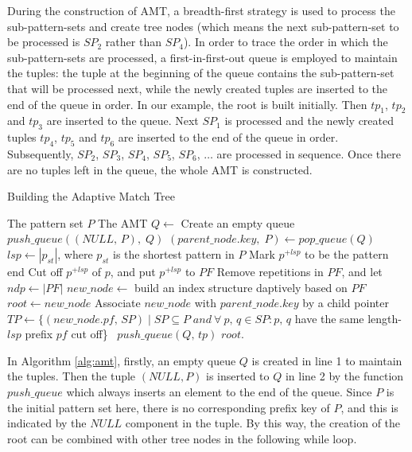 \documentclass[legalpaper]{article}
\begin{document}
During the construction of \textsf{AMT}, a \textsf{breadth-first}
strategy is used to process the sub-pattern-sets and create tree nodes
(which means the next sub-pattern-set to be processed is $SP_2$ rather
than $SP_4$). In order to trace the order in which the
sub-pattern-sets are processed, a \textsf{first-in-first-out} queue is
employed to maintain the tuples: the tuple at the beginning of the
queue contains the sub-pattern-set that will be processed next, while
the newly created tuples are inserted to the end of the queue in
order. In our example, the root is built initially. Then $tp_1$,
$tp_2$ and $tp_3$ are inserted to the queue. Next $SP_1$ is processed
and the newly created tuples $tp_4$, $tp_5$ and $tp_6$ are inserted to
the end of the queue in order. Subsequently, $SP_2$, $SP_3$, $SP_4$,
$SP_5$, $SP_6$, $\dots$ are processed in sequence. Once there are no
tuples left in the queue, the whole \textsf{AMT} is constructed.

\begin{algorithm}
  \caption{Building the Adaptive Match Tree}
  \label{alg:amt}
  \begin{algorithmic}[1]
    \REQUIRE The pattern set $P$
    \ENSURE The AMT
    \STATE $Q \leftarrow$ Create an empty queue
    \STATE $push\_queue((NULL,\,P),\; Q)$
    \STATE
    \STATE $(parent\_node.key,\; P) \leftarrow pop\_queue(Q)$
    \STATE $lsp \leftarrow |p_{st}|$, where $p_{st}$ is the shortest pattern in $P$
    \STATE Mark $p^{+lsp}$ to be the pattern end
    \ENDIF
    \STATE Cut off $p^{+lsp}$ of $p$, and put $p^{+lsp}$ to $PF$
    \ENDFOR
    \STATE Remove repetitions in $PF$, and let $ndp \leftarrow |PF|$
    \STATE $new\_node \leftarrow$ build an index structure daptively
    based on $PF$
    \STATE $root \leftarrow new\_node$
    \ELSE
    \STATE Associate $new\_node$ with $parent\_node.key$ by a child pointer
    \ENDIF
    \STATE $TP \leftarrow \{(new\_node.pf,\, SP) \mid SP \subseteq P\; and
    \ \forall \ p,\,q \in SP: p,\,q$ have the same length-$lsp$ prefix
    $pf$ cut off\}\
    \STATE $push\_queue(Q,\,tp)$
    \ENDFOR
    \ENDWHILE
    \STATE
    \RETURN $root$.
  \end{algorithmic}
\end{algorithm}

In Algorithm \ref{alg:amt}, firstly, an empty queue $Q$ is created in
line 1 to maintain the tuples. Then the tuple $(NULL, P)$ is inserted
to $Q$ in line 2 by the function $push\_queue$ which always inserts an
element to the end of the queue. Since $P$ is the initial pattern set
here, there is no corresponding prefix key of $P$, and this is
indicated by the $NULL$ component in the tuple. By this way, the
creation of the root can be combined with other tree nodes in the
following \textsf{while} loop.
\end{document}

